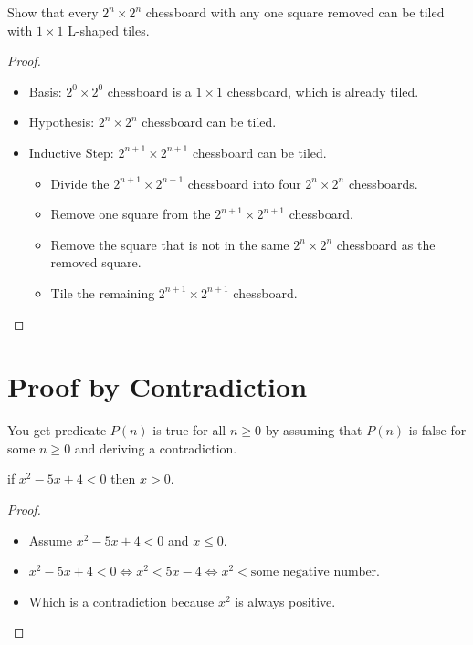 \begin{claim}
    Show that every $2^n \times 2^n$ chessboard with any one square removed can be tiled with $1\times1$ L-shaped tiles.
\end{claim}
\begin{proof}
    \begin{itemize}
        \item Basis: $2^0 \times 2^0$ chessboard is a $1\times1$ chessboard, which is already tiled.
        \item Hypothesis: $2^n \times 2^n$ chessboard can be tiled.
        \item Inductive Step: $2^{n+1} \times 2^{n+1}$ chessboard can be tiled.
              \begin{itemize}
                  \item Divide the $2^{n+1} \times 2^{n+1}$ chessboard into four $2^n \times 2^n$ chessboards.
                  \item Remove one square from the $2^{n+1} \times 2^{n+1}$ chessboard.
                  \item Remove the square that is not in the same $2^n \times 2^n$ chessboard as the removed square.
                  \item Tile the remaining $2^{n+1} \times 2^{n+1}$ chessboard.
              \end{itemize}
    \end{itemize}
\end{proof}

\section{Proof by Contradiction}
\begin{definition}
    You get predicate $P(n)$ is true for all $n \geq 0$ by assuming that $P(n)$ is false for some $n \geq 0$ and deriving a contradiction.
\end{definition}

\begin{claim}
    if $x^2 - 5x + 4 < 0$ then $x > 0$.
\end{claim}
\begin{proof}
    \begin{itemize}
        \item Assume $x^2 - 5x + 4 < 0$ and $x \leq 0$.
        \item $x^2 - 5x + 4 < 0 \iff x^2 < 5x - 4 \iff x^2 < \text{some negative number}$.
        \item Which is a contradiction because $x^2$ is always positive.
    \end{itemize}
\end{proof}

